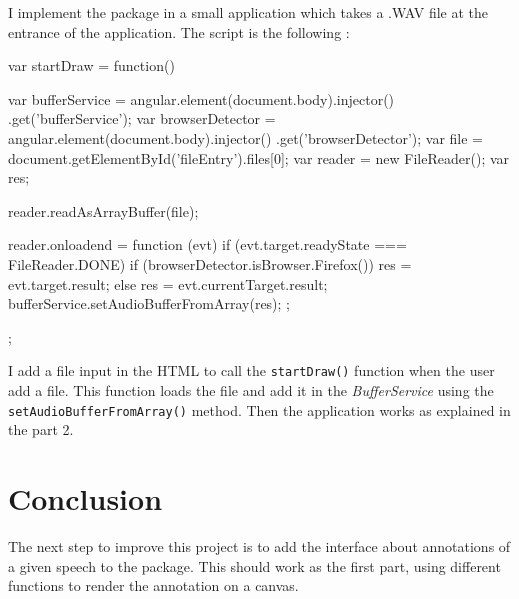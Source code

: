 \documentclass{article}
\begin{document}
I implement the package in a small application which takes a .WAV file at the entrance of the application. The script is the following : 
\begin{listing}[1]{1}
var startDraw = function(){
	var bufferService = angular.element(document.body).injector()
	.get('bufferService');
	var browserDetector = angular.element(document.body).injector()
	.get('browserDetector');
	var file = document.getElementById('fileEntry').files[0];
	var reader = new FileReader();
	var res; 

	reader.readAsArrayBuffer(file);

	reader.onloadend = function (evt) {
		if (evt.target.readyState === FileReader.DONE) {
			if (browserDetector.isBrowser.Firefox()) {
				res = evt.target.result;
			} else {
				res = evt.currentTarget.result;
			}
			bufferService.setAudioBufferFromArray(res);
		}
	};
};
\end{listing}

I add a file input in the HTML to call the \texttt{startDraw()} function when the user add a file. This function loads the file and add it in the \textit{BufferService} using the \texttt{setAudioBufferFromArray()} method. Then the application works as explained in the part 2.
\section*{Conclusion}

The next step to improve this project is to add the interface about annotations of a given speech to the package. This should work as the first part, using different functions to render the annotation on a canvas. 
\end{document}
